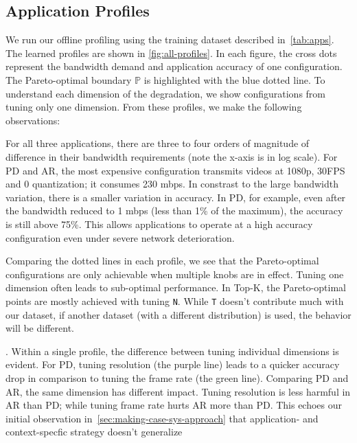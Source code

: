 \subsection{Application Profiles}
\label{sec:application-profiles}

We run our offline profiling using the training dataset described
in~\autoref{tab:apps}. The learned profiles are shown in
\autoref{fig:all-profiles}. In each figure, the cross dots represent the
bandwidth demand and application accuracy of one configuration. The
Pareto-optimal boundary $\mathbb{P}$ is highlighted with the blue dotted line. To
understand each dimension of the degradation, we show configurations from tuning
only one dimension. From these profiles, we make the following observations:

 For all three applications, there are three to
four orders of magnitude of difference in their bandwidth requirements (note the
x-axis is in log scale). For PD and AR, the most expensive configuration
transmits videos at 1080p, 30FPS and 0 quantization; it consumes 230 mbps. In
constrast to the large bandwidth variation, there is a smaller variation in
accuracy. In PD, for example, even after the bandwidth reduced to 1 mbps (less
than 1\% of the maximum), the accuracy is still above 75\%. This allows
\sysname{} applications to operate at a high accuracy configuration even under
severe network deterioration.

 Comparing the dotted lines in
each profile, we see that the Pareto-optimal configurations are only achievable
when multiple knobs are in effect. Tuning one dimension often leads to
sub-optimal performance. In Top-K, the Pareto-optimal points are mostly achieved
with tuning \texttt{N}. While \texttt{T} doesn't contribute much with our
dataset, if another dataset (with a different distribution) is used, the
behavior will be different.

. Within a single profile, the
difference between tuning individual dimensions is evident. For PD, tuning
resolution (the purple line) leads to a quicker accuracy drop in comparison to
tuning the frame rate (the green line). Comparing PD and AR, the same dimension
has different impact. Tuning resolution is less harmful in AR than PD; while
tuning frame rate hurts AR more than PD. This echoes our initial observation
in~\autoref{sec:making-case-sys-approach} that application- and context-specfic
strategy doesn't generalize

